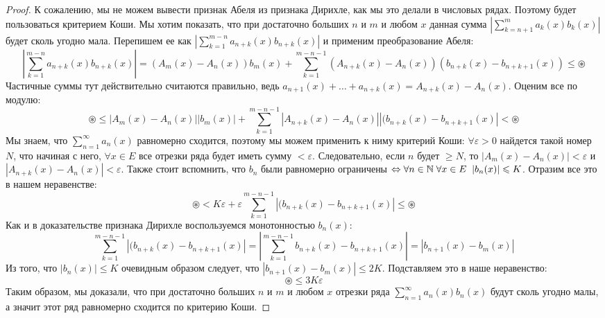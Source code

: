 \begin{proof}
    К сожалению, мы не можем вывести признак Абеля из признака Дирихле, как мы это делали в числовых рядах.
    Поэтому будет пользоваться критерием Коши. 
    Мы хотим показать, что при достаточно больших $n$ и $m$ и любом $x$ данная сумма $\left| \sum\limits_{k = n + 1}^m a_k(x)b_k(x) \right|$ будет сколь угодно мала.
    Перепишем ее как $\left| \sum\limits_{k = 1}^{m-n} a_{n+k}(x)b_{n+k}(x) \right|$ и применим преобразование Абеля: 
    \[ \left| \sum\limits_{k = 1}^{m-n} a_{n+k}(x)b_{n+k}(x) \right| = (A_m(x) - A_n(x))b_m(x) + \sum_{k = 1}^{m - n - 1} (A_{n+k}(x) - A_n(x))(b_{n+k}(x) - b_{n+k+1}(x)) \leqslant \circledast \]
    \quad Частичные суммы тут действительно считаются правильно, ведь $a_{n+1}(x) + \dots + a_{n+k}(x) = A_{n+k}(x) - A_n(x)$.
    Оценим все по модулю: \[ \circledast \leqslant |A_m(x) - A_n(x)||b_m(x)| + \sum_{k = 1}^{m - n - 1} |A_{n+k}(x) - A_n(x)||(b_{n+k}(x) - b_{n+k+1}(x)| < \circledast \]
    \quad Мы знаем, что $\sum\limits_{n = 1}^\infty a_n(x)$ равномерно сходится, поэтому мы можем применить к ниму критерий Коши: $\forall \varepsilon > 0$ найдется такой номер $N$, что начиная с него, $\forall x \in E$ все отрезки ряда будет иметь сумму $<\varepsilon$.
    Следовательно, если $n$ будет $\geqslant N$, то $|A_m(x) - A_n(x)| < \varepsilon$ и $|A_{n+k}(x) - A_n(x)| < \varepsilon$.
    Также стоит вспомнить, что $b_n$ были равномерно ограничены $\Leftrightarrow \forall n \in \mathbb{N} \; \forall x \in E \;\; |b_n(x)| \leqslant K$.
    Отразим все это в нашем неравенстве: \[ \circledast < K\varepsilon + \varepsilon \sum_{k = 1}^{m - n - 1} |(b_{n+k}(x) - b_{n+k+1}(x)| \leqslant \circledast \]
    \quad Как и в доказательстве признака Дирихле воспользуемся монотонностью $b_n(x)$:
    \[ \sum_{k = 1}^{m - n - 1} |(b_{n+k}(x) - b_{n+k+1}(x)| = \left|\sum_{k = 1}^{m - n - 1} b_{n+k}(x) - b_{n+k+1}(x) \right| = |b_{n+1}(x) - b_m(x)| \]
    \quad Из того, что $|b_n(x)| \leqslant K$ очевидным образом следует, что $|b_{n+1}(x) - b_m(x)| \leqslant 2K$. 
    Подставляем это в наше неравенство: \[ \circledast \leqslant 3K\varepsilon  \]
    \quad Таким образом, мы доказали, что при достаточно больших $n$ и $m$ и любом $x$ отрезки ряда $\sum\limits_{n = 1}^\infty a_n(x)b_n(x)$ будут сколь угодно малы, а значит этот ряд равномерно сходится по критерию Коши.
\end{proof}
